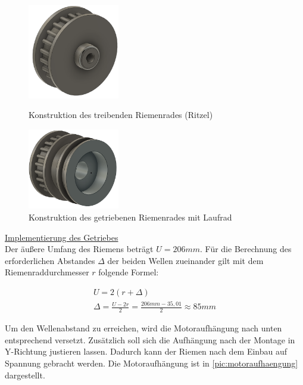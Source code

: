 \begin{figure}[h]
	\centering
	\begin{minipage}[t]{0.45\linewidth}
		\centering
		\includegraphics[width=4cm]{ritzel.png}
		\caption{Konstruktion des treibenden Riemenrades (Ritzel)}
		\label{pic:ritzel}
	\end{minipage}
	\hfil	
	\begin{minipage}[t]{0.45\linewidth}
		\centering
		\includegraphics[width=4cm]{riemenlaufrad.png}
		\caption{Konstruktion des getriebenen Riemenrades mit Laufrad}
		\label{pic:riemenlaufrad}
	\end{minipage}	
\end{figure}



\newpage


\underline{Implementierung des Getriebes}\\
Der äußere Umfang des Riemens beträgt $U = 206mm$. Für die Berechnung des erforderlichen Abstandes $\Delta$ der beiden Wellen zueinander gilt mit dem Riemenraddurchmesser $r$ folgende Formel: 


\begin{align}
	U = 2 (r+ \Delta) \\
	\Delta = \frac{U - 2r}{2} = \frac{206mm - 35,01}{2} \approx 85mm 
\end{align}

Um den Wellenabstand zu erreichen, wird die Motoraufhängung nach unten entsprechend versetzt. Zusätzlich soll sich die Aufhängung nach der Montage in Y-Richtung justieren lassen. Dadurch kann der Riemen nach dem Einbau auf Spannung gebracht werden. Die Motoraufhängung ist in \autoref{pic:motoraufhaengung} dargestellt. 


